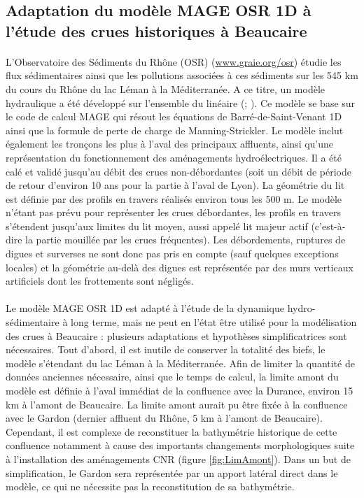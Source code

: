 	\FloatBarrier
	 \subsection{Adaptation du modèle MAGE OSR 1D à l'étude des crues historiques à Beaucaire}
	 
	 \paragraph{} L'Observatoire des Sédiments du Rhône (OSR) (\url{www.graie.org/osr}) étudie les flux sédimentaires ainsi que les pollutions associées à ces sédiments sur les 545 km du cours du Rhône du lac Léman à la Méditerranée. A ce titre, un modèle hydraulique a été développé sur l'ensemble du linéaire (\cite{dugue_accounting_2015}; \cite{launay_numerical_2019}). Ce modèle se base sur le code de calcul MAGE \citep{souhar_approach_2009} qui résout les équations de Barré-de-Saint-Venant 1D ainsi que la formule de perte de charge de Manning-Strickler. Le modèle inclut également les tronçons les plus à l'aval des principaux affluents, ainsi qu'une représentation du fonctionnement des aménagements hydroélectriques. Il a été calé et validé jusqu'au débit des crues non-débordantes (soit un débit de période de retour d'environ 10 ans pour la partie à l'aval de Lyon). La géométrie du lit est définie par des profils en travers réalisés environ tous les 500 m. Le modèle n'étant pas prévu pour représenter les crues débordantes, les profils en travers s'étendent jusqu'aux limites du lit moyen, aussi appelé lit majeur actif (c'est-à-dire la partie mouillée par les crues fréquentes). Les débordements, ruptures de digues et surverses ne sont donc pas pris en compte (sauf quelques exceptions locales) et la géométrie au-delà des digues est représentée par des murs verticaux artificiels dont les frottements sont négligés. 
	 
	 \paragraph{} Le modèle MAGE OSR 1D est adapté à l'étude de la dynamique hydro-sédimentaire à long terme, mais ne peut en l'état être utilisé pour la modélisation des crues à Beaucaire : plusieurs adaptations et hypothèses simplificatrices sont nécessaires. Tout d'abord, il est inutile de conserver la totalité des biefs, le modèle s'étendant du lac Léman à la Méditerranée. Afin de limiter la quantité de données anciennes nécessaire, ainsi que le temps de calcul, la limite amont du modèle est définie à l'aval immédiat de la confluence avec la Durance, environ 15 km à l'amont de Beaucaire. La limite amont aurait pu être fixée à la confluence avec le Gardon (dernier affluent du Rhône, 5 km à l'amont de Beaucaire). Cependant, il est complexe de reconstituer la bathymétrie historique de cette confluence notamment à cause des importants changements morphologiques suite à l'installation des aménagements CNR (figure \ref{fig:LimAmont}). Dans un but de simplification, le Gardon sera représentée par un apport latéral direct dans le modèle, ce qui ne nécessite pas la reconstitution de sa bathymétrie. 
	 
